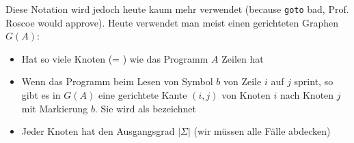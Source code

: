 Diese Notation wird jedoch heute kaum mehr verwendet (because \texttt{goto} bad, Prof. Roscoe would approve).
Heute verwendet man meist einen gerichteten Graphen $G(A)$:
\begin{itemize}
    \item Hat so viele Knoten (= ) wie das Programm $A$ Zeilen hat
    \item Wenn das Programm beim Lesen von Symbol $b$ von Zeile $i$ auf $j$ sprint, so gibt es in $G(A)$ eine gerichtete Kante $(i, j)$ von Knoten $i$ nach Knoten $j$ mit Markierung $b$. Sie wird als  bezeichnet
    \item Jeder Knoten hat den Ausgangsgrad $|\Sigma|$ (wir müssen alle Fälle abdecken)
\end{itemize}

